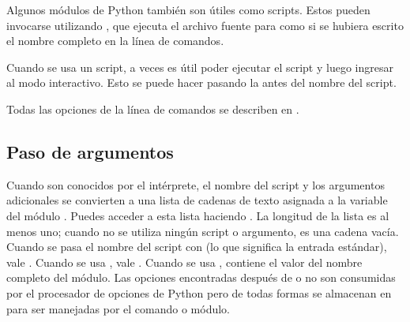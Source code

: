 \documentclass[a5paper,10pt,spanish]{sphinxmanual}
\begin{document}
\sphinxAtStartPar
Algunos módulos de Python también son útiles como scripts. Estos pueden invocarse utilizando , que ejecuta el archivo fuente para  como si se hubiera escrito el nombre completo en la línea de comandos.

\sphinxAtStartPar
Cuando se usa un script, a veces es útil poder ejecutar el script y luego ingresar al modo interactivo. Esto se puede hacer pasando la  antes del nombre del script.

\sphinxAtStartPar
Todas las opciones de la línea de comandos se describen en .


\subsection{Paso de argumentos}
\label{\detokenize{tutorial/interpreter:argument-passing}}\label{\detokenize{tutorial/interpreter:tut-argpassing}}
\sphinxAtStartPar
Cuando son conocidos por el intérprete, el nombre del script y los argumentos adicionales se convierten a una lista de cadenas de texto asignada a la variable  del módulo . Puedes acceder a esta lista haciendo . La longitud de la lista es al menos uno; cuando no se utiliza ningún script o argumento,  es una cadena vacía. Cuando se pasa el nombre del script con  (lo que significa la entrada estándar),  vale . Cuando se usa  ,  vale . Cuando se usa  ,  contiene el valor del nombre completo del módulo. Las opciones encontradas después de   o   no son consumidas por el procesador de opciones de Python pero de todas formas se almacenan en  para ser manejadas por el comando o módulo.
\end{document}
